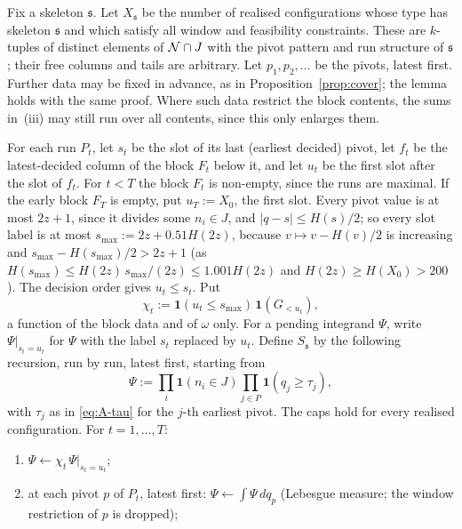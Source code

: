 Fix a skeleton $\mathfrak s$. Let $X_{\mathfrak s}$ be the number of realised configurations whose type has skeleton
$\mathfrak s$ and which satisfy all window and feasibility constraints. These are $k$-tuples of distinct elements of
$\mathcal{N}\cap J$ with the pivot pattern and run structure of $\mathfrak s$; their free columns and tails are arbitrary. Let
$p_1,p_2,\dots$ be the pivots, latest first. Further data may be fixed in advance, as in Proposition~\ref{prop:cover};
the lemma holds with the same proof. Where such data restrict the block contents, the sums in~(iii) may still run over
all contents, since this only enlarges them.

\begin{lemma}\label{lem:pil}\label{lem:PIL}
For each run $P_t$, let $s_t$ be the slot of its last (earliest decided) pivot, let $f_t$ be the latest-decided column
of the block $F_t$ below it, and let $u_t$ be the first slot after the slot of $f_t$. For $t<T$ the block $F_t$ is
non-empty, since the runs are maximal. If the early block $F_T$ is empty, put $u_T:=X_0$, the first slot.
Every pivot value is at most $2z+1$, since it divides some $n_i\in J$, and
$|q-s|\le H(s)/2$; so every slot label is at most $s_{\max}:=2z+0.51H(2z)$, because $v\mapsto v-H(v)/2$ is increasing
and $s_{\max}-H(s_{\max})/2>2z+1$ (as $H(s_{\max})\le H(2z)\,s_{\max}/(2z)\le1.001H(2z)$ and $H(2z)\ge H(X_0)>200$). The
decision order gives $u_t\le s_t$. Put
\[
  \chi_t:=\mathbf 1(u_t\le s_{\max})\,\mathbf 1(G_{<u_t}),
\]
a function of the block data and of $\omega$ only. For a pending integrand $\Psi$, write $\Psi|_{s_t=u_t}$ for $\Psi$
with the label $s_t$ replaced by $u_t$. Define $S_{\mathfrak s}$ by the following recursion, run by run, latest first,
starting from
\[
  \Psi:=\prod_i\mathbf 1(n_i\in J)\prod_{j\in P}\mathbf 1(q_j\ge\tau_j),
\]
with $\tau_j$ as in \eqref{eq:A-tau} for the $j$-th earliest pivot. The caps hold for every realised configuration.
For $t=1,\dots,T$:
\begin{enumerate}[label=(\roman*)]
\item $\Psi\leftarrow\chi_t\,\Psi|_{s_t=u_t}$;
\item at each pivot $p$ of $P_t$, latest first: $\Psi\leftarrow\int\Psi\,dq_{p}$ (Lebesgue measure; the window
  restriction of $p$ is dropped);

\end{enumerate}
\end{lemma}
